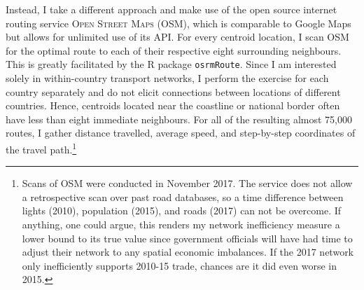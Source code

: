 \documentclass[11pt, oneside]{article}   	%
\begin{document}
Instead, I take a different approach and make use of the open source internet routing service \textsc{Open Street Maps} (OSM), which is comparable to Google Maps but allows for unlimited use of its API. For every centroid location, I scan OSM for the optimal route to each of their respective eight surrounding neighbours. This is greatly facilitated by the R package \texttt{osrmRoute}. Since I am interested solely in within-country transport networks, I perform the exercise for each country separately and do not elicit connections between locations of different countries. Hence, centroids located near the coastline or national border often have less than eight immediate neighbours. For all of the resulting almost 75,000 routes, I gather distance travelled, average speed, and step-by-step coordinates of the travel path.\footnote{Scans of OSM were conducted in November 2017. The service does not allow a retrospective scan over past road databases, so a time difference between lights (2010), population (2015), and roads (2017) can not be overcome. If anything, one could argue, this renders my network inefficiency measure a lower bound to its true value since government officials will have had time to adjust their network to any spatial economic imbalances. If the 2017 network only inefficiently supports 2010-15 trade, chances are it did even worse in 2015.}
\end{document}

